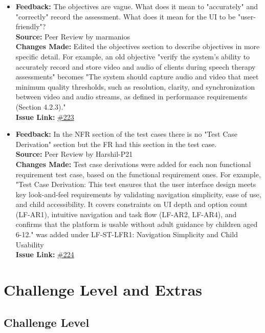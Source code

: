 \documentclass{article}
\begin{document}
\begin{itemize}
    \item 
      \textbf{Feedback:} The objectives are vague. What does it mean to "accurately" and "correctly" record the assessment. What does it mean for the UI to be "user-friendly"? \\
      \textbf{Source:} Peer Review by marmanios \\
      \textbf{Changes Made:} Edited the objectives section to describe objectives in more specific detail. For example, an old objective "verify the system's ability to accurately record and store video and audio of clients during speech therapy assessments" becomes "The system should capture audio and video that meet minimum quality thresholds, such as resolution, clarity, and synchronization between video and audio streams, as defined in performance requirements (Section 4.2.3)."\\
      \textbf{Issue Link:} \href{https://github.com/parishanizam/TeleHealth/issues/223}{\#223}

    \item 
      \textbf{Feedback:} In the NFR section of the test cases there is no "Test Case Derivation" section but the FR had this section in the test case. \\
      \textbf{Source:} Peer Review by Harshil-P21 \\
      \textbf{Changes Made:} Test case derivations were added for each non functional requirement test case, based on the functional requirement ones. For example, "Test Case Derivation: This test ensures that the user interface design meets key look-and-feel requirements by validating navigation simplicity, ease of use, and child accessibility. It covers constraints on UI depth and option count (LF-AR1), intuitive navigation and task flow (LF-AR2, LF-AR4), and confirms that the platform is usable without adult guidance by children aged 6-12." was added under LF-ST-LFR1: Navigation Simplicity and Child Usability\\
      \textbf{Issue Link:} \href{https://github.com/parishanizam/TeleHealth/issues/224}{\#224}

\end{itemize}

\section{Challenge Level and Extras}

\subsection{Challenge Level}
\end{document}
